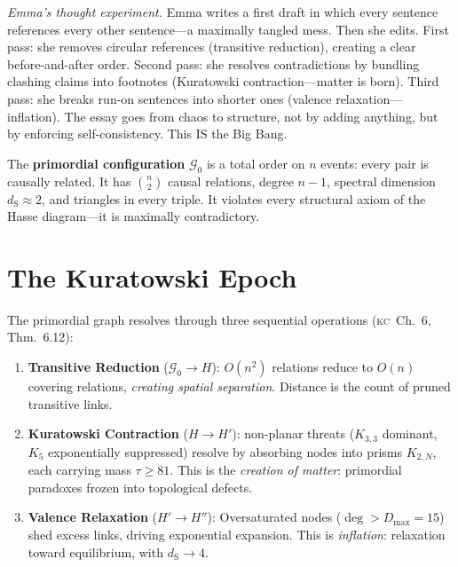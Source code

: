 \documentclass[11pt, a4paper, openany]{book}
\newcommand{\dS}{d_{\mathrm{S}}}
\newcommand{\KC}[1]{\textnormal{(\textsc{kc}~#1)}}
\newcounter{thm}[chapter]
\begin{document}
\smallskip\noindent
\textit{Emma's thought experiment.}
Emma writes a first draft in which every sentence references every other
sentence---a maximally tangled mess. Then she edits. First pass: she
removes circular references (transitive reduction), creating a clear
before-and-after order. Second pass: she resolves contradictions by
bundling clashing claims into footnotes (Kuratowski contraction---matter
is born). Third pass: she breaks run-on sentences into shorter ones
(valence relaxation---inflation). The essay goes from chaos to
structure, not by adding anything, but by enforcing self-consistency.
This IS the Big Bang.
\smallskip

\begin{definition}\label{def:primordial}
The \textbf{primordial configuration} $\mathcal{G}_0$ is a total order on $n$ events: every pair is causally related. It has $\binom{n}{2}$ causal relations, degree $n - 1$, spectral dimension $\dS \approx 2$, and triangles in every triple. It violates every structural axiom of the Hasse diagram---it is maximally contradictory.
\end{definition}

\section{The Kuratowski Epoch}\label{sec:epoch}

\begin{theorem}\label{thm:big-bang}
The primordial graph resolves through three sequential operations \KC{Ch.~6, Thm.~6.12}:
\begin{enumerate}
  \item \textbf{Transitive Reduction} ($\mathcal{G}_0 \to H$): $O(n^2)$ relations reduce to $O(n)$ covering relations, \emph{creating spatial separation}. Distance is the count of pruned transitive links.
  \item \textbf{Kuratowski Contraction} ($H \to H'$): non-planar threats ($K_{3,3}$ dominant, $K_5$ exponentially suppressed) resolve by absorbing nodes into prisms $K_{2,N}$, each carrying mass $\tau \geq 81$. This is the \emph{creation of matter}: primordial paradoxes frozen into topological defects.
  \item \textbf{Valence Relaxation} ($H' \to H''$): Oversaturated nodes ($\deg > D_{\max} = 15$) shed excess links, driving exponential expansion. This is \emph{inflation}: relaxation toward equilibrium, with $\dS \to 4$.
\end{enumerate}
\end{theorem}
\end{document}
